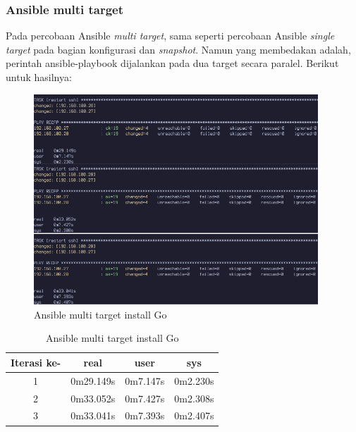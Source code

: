 \documentclass[10pt,]{report}
\begin{document}
\begin{adjustwidth}{20pt}{}
	\subsubsection{Ansible multi target}
	\begin{adjustwidth}{20pt}{}
		Pada percobaan Ansible \textit{multi target}, sama seperti percobaan Ansible \textit{single target}
		pada bagian konfigurasi dan \textit{snapshot}. Namun yang membedakan adalah, perintah
		ansible-playbook dijalankan pada dua target secara paralel. Berikut untuk hasilnya:
	\end{adjustwidth}
	\begin{figure}[H]
		\begin{center}
			\includegraphics[width=0.95\textwidth]{images/ansible/multi/ansible-go-multi-com.png}
		\end{center}
		\caption{Ansible multi target install Go}
	\end{figure}

	\begin{table}[H]
		\caption{Ansible multi target install Go}
		\begin{center}
			\begin{tabular}[c]{|c|c|c|c|}
				\hline
				\multicolumn{1}{|c|}{\textbf{Iterasi ke-}} &
				\multicolumn{1}{c|}{\textbf{real}}         &
				\multicolumn{1}{c|}{\textbf{user}}         &
				\multicolumn{1}{c|}{\textbf{sys}}                                            \\
				\hline
				1                                          & 0m29.149s & 0m7.147s & 0m2.230s \\
				\hline
				2                                          & 0m33.052s & 0m7.427s & 0m2.308s \\
				\hline
				3                                          & 0m33.041s & 0m7.393s & 0m2.407s \\
				\hline
			\end{tabular}
		\end{center}
	\end{table}

\end{adjustwidth}
\end{document}
